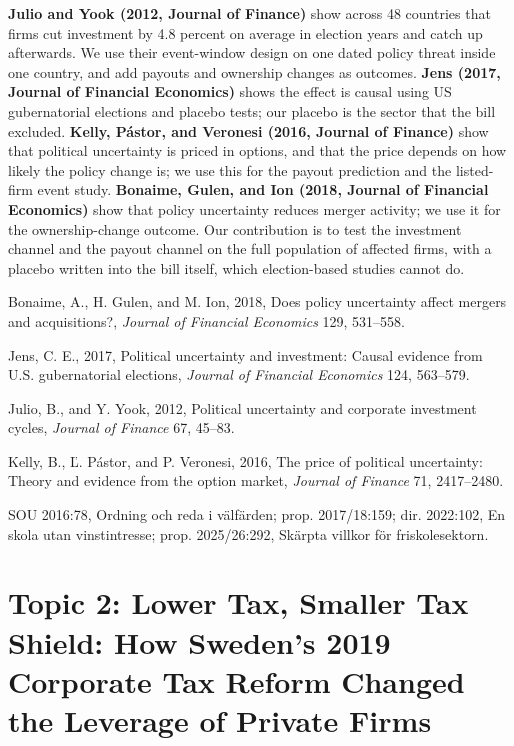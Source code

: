 \documentclass[12pt,a4paper]{article}
\newenvironment{refs}{\begin{list}{}{\setlength{\leftmargin}{1.5em}\setlength{\itemindent}{-1.5em}\setlength{\itemsep}{0pt}\setlength{\parsep}{0pt}}\small}{\end{list}}
\begin{document}
\textbf{Julio and Yook (2012, Journal of Finance)} show across 48 countries that firms cut investment by 4.8 percent on average in election years and catch up afterwards. We use their event-window design on one dated policy threat inside one country, and add payouts and ownership changes as outcomes. \textbf{Jens (2017, Journal of Financial Economics)} shows the effect is causal using US gubernatorial elections and placebo tests; our placebo is the sector that the bill excluded. \textbf{Kelly, P\'astor, and Veronesi (2016, Journal of Finance)} show that political uncertainty is priced in options, and that the price depends on how likely the policy change is; we use this for the payout prediction and the listed-firm event study. \textbf{Bonaime, Gulen, and Ion (2018, Journal of Financial Economics)} show that policy uncertainty reduces merger activity; we use it for the ownership-change outcome. Our contribution is to test the investment channel and the payout channel on the full population of affected firms, with a placebo written into the bill itself, which election-based studies cannot do.

\begin{refs}
\item Bonaime, A., H. Gulen, and M. Ion, 2018, Does policy uncertainty affect mergers and acquisitions?, \emph{Journal of Financial Economics} 129, 531--558.
\item Jens, C. E., 2017, Political uncertainty and investment: Causal evidence from U.S. gubernatorial elections, \emph{Journal of Financial Economics} 124, 563--579.
\item Julio, B., and Y. Yook, 2012, Political uncertainty and corporate investment cycles, \emph{Journal of Finance} 67, 45--83.
\item Kelly, B., \v{L}. P\'astor, and P. Veronesi, 2016, The price of political uncertainty: Theory and evidence from the option market, \emph{Journal of Finance} 71, 2417--2480.
\item SOU 2016:78, Ordning och reda i v\"alf\"arden; prop. 2017/18:159; dir. 2022:102, En skola utan vinstintresse; prop. 2025/26:292, Sk\"arpta villkor f\"or friskolesektorn.
\end{refs}

\section{Topic 2: Lower Tax, Smaller Tax Shield: How Sweden's 2019 Corporate Tax Reform Changed the Leverage of Private Firms}
\end{document}
